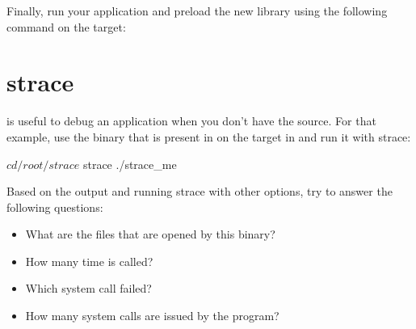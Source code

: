 Finally, run your application and preload the new library using the following
command on the target:

\section{strace}

 is useful to debug an application when you don't have the source.
For that example, use the  binary that is present in on the
target in  and run it with strace:

\begin{bashinput}
$ cd /root/strace
$ strace ./strace_me
\end{bashinput}

Based on the output and running strace with other options, try to answer the
following questions:
\begin{itemize}
  \item What are the files that are opened by this binary?
  \item How many time is  called?
  \item Which  system call failed?
  \item How many system calls are issued by the program?
\end{itemize}
